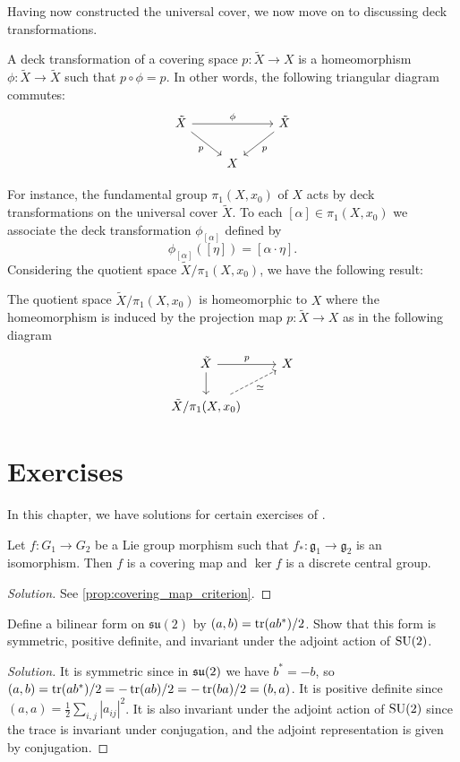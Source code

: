 \documentclass{report}
\begin{document}
Having now constructed the universal cover, we now move on to discussing deck transformations.
\begin{definition}
    A deck transformation of a covering space $p: \tilde X \to X$ is a homeomorphism $\phi: \tilde X \to \tilde X$ such that $p \circ \phi = p$.
    In other words, the following triangular diagram commutes:
    \[
    \begin{tikzcd}
        \tilde X \arrow[rr, "\phi"] \arrow[rd, "p"'] & & \tilde X \arrow[ld, "p"] \\
        & X &
    \end{tikzcd}
    \]
\end{definition}
For instance, the fundamental group $\pi_1(X, x_0)$ of $X$ acts by deck transformations on the universal cover $\tilde X$.
To each $[\alpha] \in \pi_1(X, x_0)$ we associate the deck transformation $\phi_{[\alpha]}$ defined by
\[
\phi_{[\alpha]}([\eta]) = [\alpha \cdot \eta].
\]
Considering the quotient space $\tilde X / \pi_1(X, x_0)$, we have the following result:
\begin{theorem}
    The quotient space $\tilde X / \pi_1(X, x_0)$ is homeomorphic to $X$ where the homeomorphism is induced by the projection map $p: \tilde X \to X$ as in the following diagram
    \[
    \begin{tikzcd}
        \tilde X \arrow[r, "p"] \arrow[d] & X \\
        \tilde X / \pi_1(X, x_0) \arrow[ur, "\simeq"', dashed]
    \end{tikzcd}
    \]
\end{theorem}

\chapter{Exercises}
In this chapter, we have solutions for certain exercises of \cite{kirillov2008introduction}.

\begin{exercise}[Exercise 2.3]
    Let $f:G_1 \to G_2$ be a Lie group morphism such that $f_*: \mathfrak g_1 \to \mathfrak g_2$ is an isomorphism.
    Then $f$ is a covering map and $\ker f$ is a discrete central group.
\end{exercise}
\begin{proof}[Solution]
    See \cref{prop:covering_map_criterion}.
\end{proof}
\begin{exercise}[Exercise 2.7]
Define a bilinear form on $\mathfrak{su}(2)$ by $(a, b) = \operatorname{tr}(ab^*)/2$. 
Show that this form is symmetric, positive deﬁnite, and invariant under the adjoint action of
$\operatorname{{\mathrm{SU}}}(2)$.
\end{exercise}
\begin{proof}[Solution]
    It is symmetric since in $\operatorname{{\mathfrak{su}}}(2)$ we have $b^* = -b$, so $(a,b) = \operatorname{tr}(ab^*)/2 = -\operatorname{tr}(ab)/2 = 
    -\operatorname{tr}(ba)/2 = (b,a)$.
    It is positive definite since $(a,a) = \frac{1}{2} \sum_{i,j} |a_{ij}|^2$.
    It is also invariant under the adjoint action of $\operatorname{{\mathrm{SU}}}(2)$ since the trace is invariant under conjugation, and the adjoint representation is given by conjugation.
\end{proof}
\end{document}
